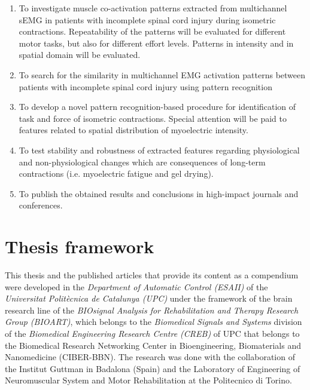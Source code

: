 \begin{enumerate}[I]

\item To investigate muscle co-activation patterns extracted from multichannel sEMG in patients with incomplete spinal cord injury during isometric contractions. Repeatability of the patterns will be evaluated for different motor tasks, but also for different effort levels. Patterns in intensity and in spatial domain will be evaluated.

\item To search for the similarity in multichannel EMG activation patterns between patients with incomplete spinal cord injury using pattern recognition

\item To develop a novel pattern recognition-based procedure for identification of task and force of isometric contractions. Special attention will be paid to features related to spatial distribution of myoelectric intensity. 

\item To test stability and robustness of extracted features regarding physiological and non-physiological changes which are consequences of long-term contractions (i.e. myoelectric fatigue and gel drying).

\item To publish the obtained results and conclusions in high-impact journals and conferences.

\end{enumerate}

     \section{Thesis framework}
     
This thesis and the published articles that provide its content as a compendium were developed in the \emph{Department of Automatic Control (ESAII)} of the \emph{Universitat Polit\`{e}cnica de Catalunya (UPC)} under the framework of the brain research line of the \emph{BIOsignal Analysis for Rehabilitation and Therapy Research Group (BIOART)}, which belongs to the \emph{Biomedical Signals and Systems} division of the \emph{Biomedical Engineering Research Centre (CREB)} of UPC that belongs to the Biomedical Research Networking Center in Bioengineering, Biomaterials and Nanomedicine (CIBER-BBN). The research was done with the collaboration of the Institut Guttman in Badalona (Spain) and the Laboratory of Engineering of Neuromuscular System and Motor Rehabilitation at the Politecnico di Torino.


